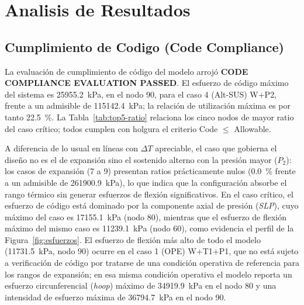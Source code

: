 \section{Analisis de Resultados}
\label{sec:analisis}

\subsection{Cumplimiento de Codigo (Code Compliance)}

La evaluaci\'{o}n de cumplimiento de c\'{o}digo del modelo arroj\'{o}
\textbf{CODE COMPLIANCE EVALUATION PASSED}. El esfuerzo de c\'{o}digo
m\'{a}ximo del sistema es \num{25955.2}~\si{kPa}, en el nodo 90, para el caso
4 (Alt-SUS) W+P2, frente a un admisible de \num{115142.4}~\si{kPa}; la
relaci\'{o}n de utilizaci\'{o}n m\'{a}xima es por tanto 22.5~\%. La
Tabla~\ref{tab:top5-ratio} relaciona los cinco nodos de mayor ratio del caso
cr\'{i}tico; todos cumplen con holgura el criterio Code $\leq$ Allowable.



A diferencia de lo usual en l\'{i}neas con $\Delta T$ apreciable, el caso que
gobierna el dise\~{n}o no es el de expansi\'{o}n sino el sostenido alterno con
la presi\'{o}n mayor ($P_2$): los casos de expansi\'{o}n (7 a 9) presentan
ratios pr\'{a}cticamente nulos (0.0~\% frente a un admisible de
\num{261900.9}~\si{kPa}), lo que indica que la configuraci\'{o}n absorbe el
rango t\'{e}rmico sin generar esfuerzos de flexi\'{o}n significativos. En el
caso cr\'{i}tico, el esfuerzo de c\'{o}digo est\'{a} dominado por la componente
axial de presi\'{o}n (\textit{SLP}), cuyo m\'{a}ximo del caso es
\num{17155.1}~\si{kPa} (nodo 80), mientras que el esfuerzo de flexi\'{o}n
m\'{a}ximo del mismo caso es \num{11239.1}~\si{kPa} (nodo 60), como evidencia
el perfil de la Figura~\ref{fig:esfuerzos}. El esfuerzo de flexi\'{o}n m\'{a}s
alto de todo el modelo (\num{11731.5}~\si{kPa}, nodo 90) ocurre en el caso 1
(OPE) W+T1+P1, que no est\'{a} sujeto a verificaci\'{o}n de c\'{o}digo por
tratarse de una condici\'{o}n operativa de referencia para los rangos de
expansi\'{o}n; en esa misma condici\'{o}n operativa el modelo reporta un
esfuerzo circunferencial (\textit{hoop}) m\'{a}ximo de \num{34919.9}~\si{kPa}
en el nodo 80 y una intensidad de esfuerzo m\'{a}xima de
\num{36794.7}~\si{kPa} en el nodo 90.

